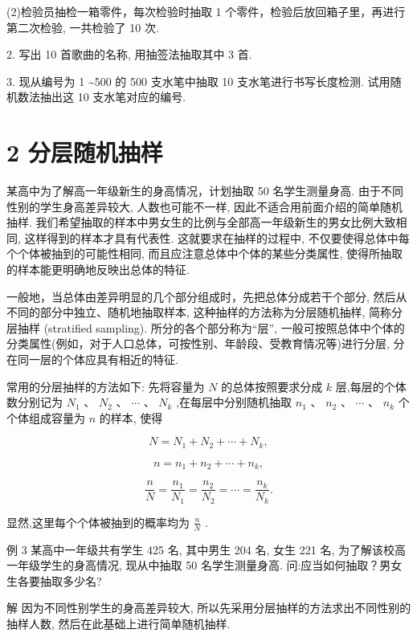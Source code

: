 \documentclass[10pt]{article}
\begin{document}
(2)检验员抽检一箱零件，每次检验时抽取 1 个零件，检验后放回箱子里，再进行第二次检验, 一共检验了 10 次.

2. 写出 10 首歌曲的名称, 用抽签法抽取其中 3 首.

3. 现从编号为 1 \textasciitilde 500 的 500 支水笔中抽取 10 支水笔进行书写长度检测. 试用随机数法抽出这 10 支水笔对应的编号.

\section*{2 分层随机抽样}

某高中为了解高一年级新生的身高情况，计划抽取 50 名学生测量身高. 由于不同性别的学生身高差异较大, 人数也可能不一样, 因此不适合用前面介绍的简单随机抽样. 我们希望抽取的样本中男女生的比例与全部高一年级新生的男女比例大致相同, 这样得到的样本才具有代表性. 这就要求在抽样的过程中, 不仅要使得总体中每个个体被抽到的可能性相同, 而且应注意总体中个体的某些分类属性, 使得所抽取的样本能更明确地反映出总体的特征.





一般地，当总体由差异明显的几个部分组成时，先把总体分成若干个部分, 然后从不同的部分中独立、随机地抽取样本, 这种抽样的方法称为分层随机抽样, 简称分层抽样 (stratified sampling). 所分的各个部分称为“层”, 一般可按照总体中个体的分类属性(例如，对于人口总体，可按性别、年龄段、受教育情况等)进行分层, 分在同一层的个体应具有相近的特征.

常用的分层抽样的方法如下: 先将容量为 \(N\) 的总体按照要求分成 \(k\) 层,每层的个体数分别记为 \({N}_{1}\text{ 、 }{N}_{2}\text{ 、 }\cdots \text{ 、 }{N}_{k}\) ,在每层中分别随机抽取 \({n}_{1}\text{ 、 }{n}_{2}\text{ 、 }\cdots \text{ 、 }{n}_{k}\) 个个体组成容量为 \(n\) 的样本, 使得

\[
N = {N}_{1} + {N}_{2} + \cdots  + {N}_{k},
\]

\[
n = {n}_{1} + {n}_{2} + \cdots  + {n}_{k},
\]

\[
\frac{n}{N} = \frac{{n}_{1}}{{N}_{1}} = \frac{{n}_{2}}{{N}_{2}} = \cdots  = \frac{{n}_{k}}{{N}_{k}}.
\]

显然,这里每个个体被抽到的概率均为 \(\frac{n}{N}\) .

例 3 某高中一年级共有学生 425 名, 其中男生 204 名, 女生 221 名, 为了解该校高一年级学生的身高情况, 现从中抽取 50 名学生测量身高. 问:应当如何抽取？男女生各要抽取多少名?

解 因为不同性别学生的身高差异较大, 所以先采用分层抽样的方法求出不同性别的抽样人数, 然后在此基础上进行简单随机抽样.
\end{document}
